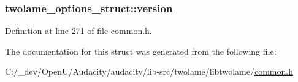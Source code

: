 \subsubsection[{\texorpdfstring{version}{version}}]{ twolame\+\_\+options\+\_\+struct\+::version}\hypertarget{structtwolame__options__struct_a8bfca52309d5777333b4646461ab9a16}{}\label{structtwolame__options__struct_a8bfca52309d5777333b4646461ab9a16}


Definition at line 271 of file common.\+h.



The documentation for this struct was generated from the following file\+:\begin{DoxyCompactItemize}
\item 
C\+:/\+\_\+dev/\+Open\+U/\+Audacity/audacity/lib-\/src/twolame/libtwolame/\hyperlink{twolame_2libtwolame_2common_8h}{common.\+h}\end{DoxyCompactItemize}

